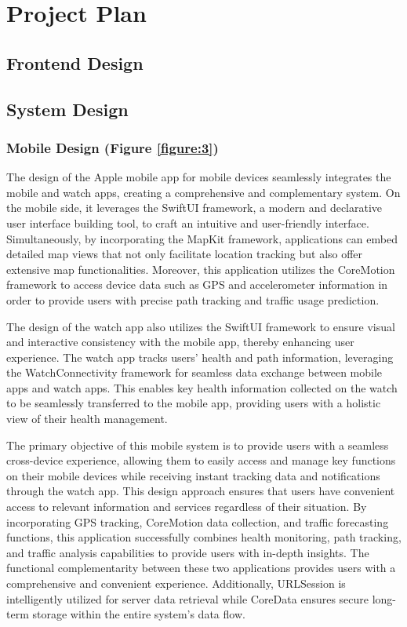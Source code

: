 \documentclass[12pt,two side]{report}
\begin{document}
\chapter{Project Plan}
\section{Frontend Design}
\section{System Design}
\subsection{Mobile Design (Figure \ref{figure:3})}
The design of the Apple mobile app for mobile devices seamlessly integrates the mobile and watch apps, creating a comprehensive and complementary system. On the mobile side, it leverages the SwiftUI framework, a modern and declarative user interface building tool, to craft an intuitive and user-friendly interface. Simultaneously, by incorporating the MapKit framework, applications can embed detailed map views that not only facilitate location tracking but also offer extensive map functionalities. Moreover, this application utilizes the CoreMotion framework to access device data such as GPS and accelerometer information in order to provide users with precise path tracking and traffic usage prediction.\newline

The design of the watch app also utilizes the SwiftUI framework to ensure visual and interactive consistency with the mobile app, thereby enhancing user experience. The watch app tracks users' health and path information, leveraging the WatchConnectivity framework for seamless data exchange between mobile apps and watch apps. This enables key health information collected on the watch to be seamlessly transferred to the mobile app, providing users with a holistic view of their health management.\newline

The primary objective of this mobile system is to provide users with a seamless cross-device experience, allowing them to easily access and manage key functions on their mobile devices while receiving instant tracking data and notifications through the watch app. This design approach ensures that users have convenient access to relevant information and services regardless of their situation. By incorporating GPS tracking, CoreMotion data collection, and traffic forecasting functions, this application successfully combines health monitoring, path tracking, and traffic analysis capabilities to provide users with in-depth insights. The functional complementarity between these two applications provides users with a comprehensive and convenient experience. Additionally, URLSession is intelligently utilized for server data retrieval while CoreData ensures secure long-term storage within the entire system's data flow.
\end{document}
